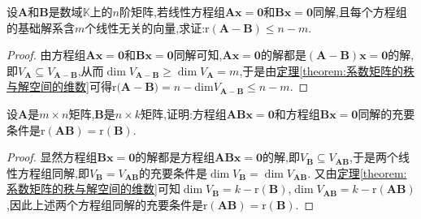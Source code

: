 \documentclass[../../main.tex]{subfiles}
\begin{document}
\begin{example}
设\(\boldsymbol{A}\)和\(\boldsymbol{B}\)是数域\(\mathbb{K}\)上的\(n\)阶矩阵,若线性方程组\(\boldsymbol{A}\boldsymbol{x}=\boldsymbol{0}\)和\(\boldsymbol{B}\boldsymbol{x}=\boldsymbol{0}\)同解,且每个方程组的基础解系含\(m\)个线性无关的向量,求证:\(\mathrm{r}(\boldsymbol{A}-\boldsymbol{B})\leqslant  n - m\).
\end{example}
\begin{proof}
由方程组\(\boldsymbol{A}\boldsymbol{x}=\boldsymbol{0}\)和\(\boldsymbol{B}\boldsymbol{x}=\boldsymbol{0}\)同解可知,\(\boldsymbol{A}\boldsymbol{x}=\boldsymbol{0}\)的解都是\((\boldsymbol{A}-\boldsymbol{B})\boldsymbol{x}=\boldsymbol{0}\)的解,即\(V_{\boldsymbol{A}}\subseteq V_{\boldsymbol{A}-\boldsymbol{B}}\),从而\(\dim V_{\boldsymbol{A}-\boldsymbol{B}}\geqslant \dim V_{\boldsymbol{A}} = m\),于是由\hyperref[theorem:系数矩阵的秩与解空间的维数]{定理\ref{theorem:系数矩阵的秩与解空间的维数}}可得$\mathrm{r(}\boldsymbol{A}-\boldsymbol{B})=n-\mathrm{dim}V_{\boldsymbol{A}-\boldsymbol{B}}\le n-m$.
\end{proof}

\begin{proposition}\label{proposition:ABx=O与Bx=O同解的充要条件}
设\(\boldsymbol{A}\)是\(m\times n\)矩阵,\(\boldsymbol{B}\)是\(n\times k\)矩阵,证明:方程组\(\boldsymbol{A}\boldsymbol{B}\boldsymbol{x}=\boldsymbol{0}\)和方程组\(\boldsymbol{B}\boldsymbol{x}=\boldsymbol{0}\)同解的充要条件是\(\mathrm{r}(\boldsymbol{A}\boldsymbol{B})=\mathrm{r}(\boldsymbol{B})\).
\end{proposition}
\begin{proof}
显然方程组\(\boldsymbol{B}\boldsymbol{x}=\boldsymbol{0}\)的解都是方程组\(\boldsymbol{A}\boldsymbol{B}\boldsymbol{x}=\boldsymbol{0}\)的解,即\(V_{\boldsymbol{B}}\subseteq V_{\boldsymbol{A}\boldsymbol{B}}\),于是两个线性方程组同解,即\(V_{\boldsymbol{B}} = V_{\boldsymbol{A}\boldsymbol{B}}\)的充要条件是\(\dim V_{\boldsymbol{B}}=\dim V_{\boldsymbol{A}\boldsymbol{B}}\). 又由\hyperref[theorem:系数矩阵的秩与解空间的维数]{定理\ref{theorem:系数矩阵的秩与解空间的维数}}可知\(\dim V_{\boldsymbol{B}}=k - \mathrm{r}(\boldsymbol{B})\),\(\dim V_{\boldsymbol{A}\boldsymbol{B}}=k - \mathrm{r}(\boldsymbol{A}\boldsymbol{B})\),因此上述两个方程组同解的充要条件是\(\mathrm{r}(\boldsymbol{A}\boldsymbol{B})=\mathrm{r}(\boldsymbol{B})\). 
\end{proof}
\end{document}
